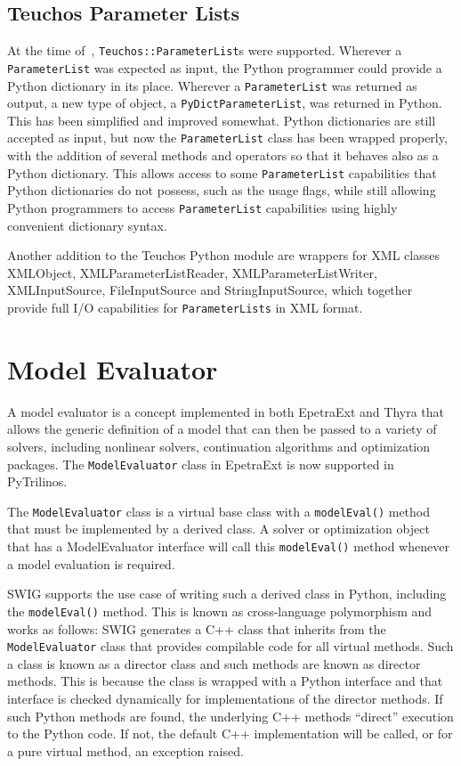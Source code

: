 \documentclass[11pt]{article}
\begin{document}
\subsection{Teuchos Parameter Lists}
\label{sec:teuchos_parameterlists}

At the time of~\cite{PyTrilinos}, {\tt Teuchos::ParameterList}s were supported.  Wherever a {\tt ParameterList} was expected as input, the Python programmer could provide a Python dictionary in its place.  Wherever a {\tt ParameterList} was returned as output, a new type of object, a {\tt PyDictParameterList}, was returned in Python.  This has been simplified and improved somewhat.  Python dictionaries are still accepted as input, but now the {\tt ParameterList} class has been wrapped properly, with the addition of several methods and operators so that it behaves also as a Python dictionary.  This allows access to some {\tt ParameterList} capabilities that Python dictionaries do not possess, such as the usage flags, while still allowing Python programmers to access {\tt ParameterList} capabilities using highly convenient dictionary syntax.

Another addition to the Teuchos Python module are wrappers for XML classes XMLObject, XMLParameterListReader, XMLParameterListWriter, XMLInputSource, FileInputSource and StringInputSource, which together provide full I/O capabilities for {\tt ParameterLists} in XML format.

\section{Model Evaluator}
\label{sec:modelevaluator}

A model evaluator is a concept implemented in both EpetraExt and Thyra that allows the generic definition of a model that can then be passed to a variety of solvers, including nonlinear solvers, continuation algorithms and optimization packages.  The {\tt ModelEvaluator} class in EpetraExt is now supported in PyTrilinos.

The {\tt ModelEvaluator} class is a virtual base class with a {\tt modelEval()} method that must be implemented by a derived class.  A solver or optimization object that has a ModelEvaluator interface will call this {\tt modelEval()} method whenever a model evaluation is required.

SWIG supports the use case of writing such a derived class in Python, including the {\tt modelEval()} method.  This is known as cross-language polymorphism and works as follows:  SWIG generates a C++ class that inherits from the {\tt ModelEvaluator} class that provides compilable code for all virtual methods.  Such a class is known as a director class and such methods are known as director methods.  This is because the class is wrapped with a Python interface and that interface is checked dynamically for implementations of the director methods.  If such Python methods are found, the underlying C++ methods ``direct'' execution to the Python code.  If not, the default C++ implementation will be called, or for a pure virtual method, an exception raised.
\end{document}
